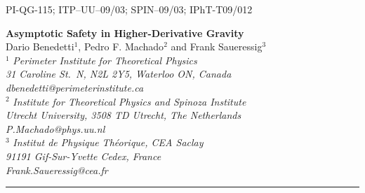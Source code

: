 \documentclass[11pt,reqno]{article}
\newcommand{\2}{\sqrt{2\,}}
\begin{document}


\thispagestyle{empty}
\begin{flushright} \small
PI-QG-115; ITP--UU--09/03; SPIN--09/03; IPhT-T09/012
\end{flushright}
\bigskip

\begin{center}
 {\LARGE\bfseries Asymptotic Safety in Higher-Derivative Gravity}
\\[10mm]
Dario Benedetti$^1$, Pedro F. Machado$^2$ and Frank Saueressig$^{3}$ \\[3mm]
$^1${\small\slshape
Perimeter Institute for Theoretical Physics \\
31 Caroline St.\ N, N2L 2Y5, Waterloo ON, Canada \\
{\upshape\ttfamily dbenedetti@perimeterinstitute.ca} } \\[3mm]
$^2${\small\slshape
Institute for Theoretical Physics \emph{and} Spinoza Institute \\
Utrecht University, 3508 TD Utrecht, The Netherlands \\
{\upshape\ttfamily P.Machado@phys.uu.nl} }
\\[3mm]
$^3${\small\slshape
Institut de Physique Th\'eorique, CEA Saclay \\
91191 Gif-Sur-Yvette Cedex, France \\
{\upshape\ttfamily Frank.Saueressig@cea.fr} }\\

\end{center}
\vspace{5mm}

\hrule\bigskip

\begin{abstract}
We study the non-perturbative renormalization group flow of higher-derivative gravity employing functional renormalization group techniques. The non-perturbative contributions to the $\beta$-functions shift the known perturbative ultraviolet fixed point into a non-trivial fixed point with three UV-attractive and one UV-repulsive eigendirections, consistent with the asymptotic safety conjecture of gravity. The implication of this transition on the unitarity problem, typically haunting higher-derivative gravity theories, is discussed.


\end{abstract}
\end{document}
